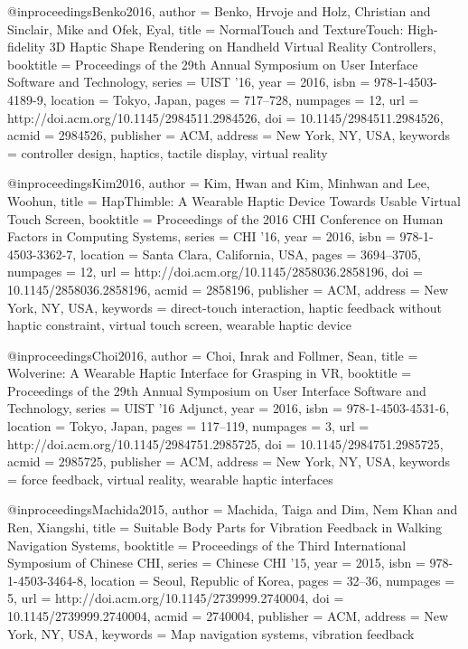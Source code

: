 @inproceedings{Benko2016,
 author = {Benko, Hrvoje and Holz, Christian and Sinclair, Mike and Ofek, Eyal},
 title = {{NormalTouch and TextureTouch: High-fidelity 3D Haptic Shape Rendering on Handheld Virtual Reality Controllers}},
 booktitle = {Proceedings of the 29th Annual Symposium on User Interface Software and Technology},
 series = {UIST '16},
 year = {2016},
 isbn = {978-1-4503-4189-9},
 location = {Tokyo, Japan},
 pages = {717--728},
 numpages = {12},
 url = {http://doi.acm.org/10.1145/2984511.2984526},
 doi = {10.1145/2984511.2984526},
 acmid = {2984526},
 publisher = {ACM},
 address = {New York, NY, USA},
 keywords = {controller design, haptics, tactile display, virtual reality}
 }

 @inproceedings{Kim2016,
 author = {Kim, Hwan and Kim, Minhwan and Lee, Woohun},
 title = {{HapThimble: A Wearable Haptic Device Towards Usable Virtual Touch Screen}},
 booktitle = {Proceedings of the 2016 CHI Conference on Human Factors in Computing Systems},
 series = {CHI '16},
 year = {2016},
 isbn = {978-1-4503-3362-7},
 location = {Santa Clara, California, USA},
 pages = {3694--3705},
 numpages = {12},
 url = {http://doi.acm.org/10.1145/2858036.2858196},
 doi = {10.1145/2858036.2858196},
 acmid = {2858196},
 publisher = {ACM},
 address = {New York, NY, USA},
 keywords = {direct-touch interaction, haptic feedback without haptic constraint, virtual touch screen, wearable haptic device}
} 

@inproceedings{Choi2016,
 author = {Choi, Inrak and Follmer, Sean},
 title = {{Wolverine: A Wearable Haptic Interface for Grasping in VR}},
 booktitle = {Proceedings of the 29th Annual Symposium on User Interface Software and Technology},
 series = {UIST '16 Adjunct},
 year = {2016},
 isbn = {978-1-4503-4531-6},
 location = {Tokyo, Japan},
 pages = {117--119},
 numpages = {3},
 url = {http://doi.acm.org/10.1145/2984751.2985725},
 doi = {10.1145/2984751.2985725},
 acmid = {2985725},
 publisher = {ACM},
 address = {New York, NY, USA},
 keywords = {force feedback, virtual reality, wearable haptic interfaces}
} 

@inproceedings{Machida2015,
 author = {Machida, Taiga and Dim, Nem Khan and Ren, Xiangshi},
 title = {{Suitable Body Parts for Vibration Feedback in Walking Navigation Systems}},
 booktitle = {Proceedings of the Third International Symposium of Chinese CHI},
 series = {Chinese CHI '15},
 year = {2015},
 isbn = {978-1-4503-3464-8},
 location = {Seoul, Republic of Korea},
 pages = {32--36},
 numpages = {5},
 url = {http://doi.acm.org/10.1145/2739999.2740004},
 doi = {10.1145/2739999.2740004},
 acmid = {2740004},
 publisher = {ACM},
 address = {New York, NY, USA},
 keywords = {Map navigation systems, vibration feedback}
}

